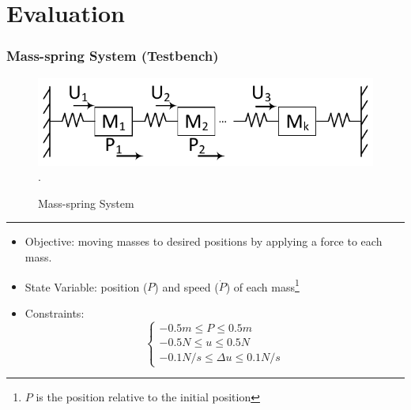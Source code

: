 \documentclass{beamer}
\begin{document}
\section{Evaluation}
\begin{frame}
\frametitle{Mass-spring System (Testbench)}
\begin{figure}[t]
\centering
\captionsetup{justification=centering}
\includegraphics[scale=.48]{../ASAP_17/figure/massspring.pdf}
\DeclareGraphicsExtensions.
\caption{Mass-spring System\label{fig_ms}}
\end{figure}
\hrule
\begin{itemize}
	\item Objective: moving masses to desired positions by applying a force to each mass. 
	\item State Variable: position ($P$) and speed ($\dot P$) of each mass\footnote{$P$ is the position relative to the initial position}
	\item Constraints: 
\[
  \begin{cases*}
    -0.5m\leq P\leq 0.5m\\
    -0.5N\leq u\leq 0.5N\\
    -0.1N/s \leq \Delta u\leq 0.1N/s
  \end{cases*}\]
\end{itemize}
\end{frame}
\end{document}
